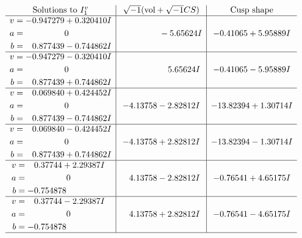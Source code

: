 \documentclass[1p]{elsarticle_modified}
\theoremstyle{definition}
\newcommand{\I}{\sqrt{-1}}
\begin{document}
$$\begin{array}{c|c|c}  
\text{Solutions to }I^v_{1}& \I (\text{vol} + \sqrt{-1}CS) & \text{Cusp shape}\\
 \hline 
\begin{aligned}
v &= -0.947279 + 0.320410 I \\
a &= \phantom{-0.000000 } 0 \\
b &= \phantom{-}0.877439 - 0.744862 I\end{aligned}
 & \phantom{-0.000000 } -5.65624 I & -0.41065 + 5.95889 I \\ \hline\begin{aligned}
v &= -0.947279 - 0.320410 I \\
a &= \phantom{-0.000000 } 0 \\
b &= \phantom{-}0.877439 + 0.744862 I\end{aligned}
 & \phantom{-0.000000 -}5.65624 I & -0.41065 - 5.95889 I \\ \hline\begin{aligned}
v &= \phantom{-}0.069840 + 0.424452 I \\
a &= \phantom{-0.000000 } 0 \\
b &= \phantom{-}0.877439 - 0.744862 I\end{aligned}
 & -4.13758 - 2.82812 I & -13.82394 + 1.30714 I \\ \hline\begin{aligned}
v &= \phantom{-}0.069840 - 0.424452 I \\
a &= \phantom{-0.000000 } 0 \\
b &= \phantom{-}0.877439 + 0.744862 I\end{aligned}
 & -4.13758 + 2.82812 I & -13.82394 - 1.30714 I \\ \hline\begin{aligned}
v &= \phantom{-}0.37744 + 2.29387 I \\
a &= \phantom{-0.000000 } 0 \\
b &= -0.754878\phantom{ +0.000000I}\end{aligned}
 & \phantom{-}4.13758 - 2.82812 I & -0.76541 + 4.65175 I \\ \hline\begin{aligned}
v &= \phantom{-}0.37744 - 2.29387 I \\
a &= \phantom{-0.000000 } 0 \\
b &= -0.754878\phantom{ +0.000000I}\end{aligned}
 & \phantom{-}4.13758 + 2.82812 I & -0.76541 - 4.65175 I\\
 \hline 
 \end{array}$$\newpage\newpage\renewcommand{\arraystretch}{1}
\end{document}
